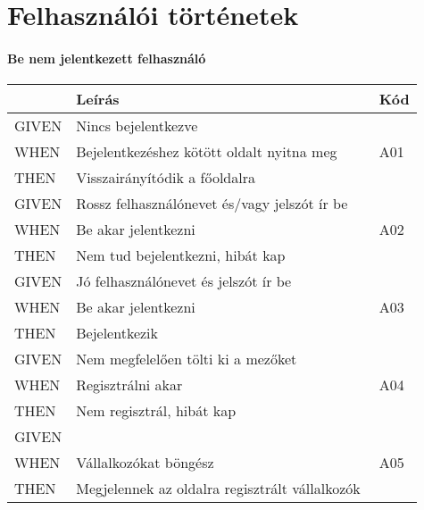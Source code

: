 \chapter{Felhasználói történetek}
\label{ch:stories}

\subsubsection{Be nem jelentkezett felhasználó}

\begin{table}[H]
	\centering
	\begin{tabular}{|m{0.1\linewidth}|m{0.75\linewidth}|m{0.06\linewidth}|}
		\hline
		& \textbf{Leírás} & \textbf{Kód} \\
		\hline
		GIVEN & Nincs bejelentkezve & \multirow{3}{*}{A01} \\ \cline{1-2}
		WHEN  & Bejelentkezéshez kötött oldalt nyitna meg & \\ \cline{1-2}
		THEN  & Visszairányítódik a főoldalra & \\ 
		\hline
		GIVEN & Rossz felhasználónevet és/vagy jelszót ír be & \multirow{3}{*}{A02} \\ \cline{1-2}
		WHEN  & Be akar jelentkezni & \\ \cline{1-2}
		THEN  & Nem tud bejelentkezni, hibát kap & \\ 
		\hline
		GIVEN & Jó felhasználónevet és jelszót ír be & \multirow{3}{*}{A03} \\ \cline{1-2}
		WHEN  & Be akar jelentkezni & \\ \cline{1-2}
		THEN  & Bejelentkezik & \\ 
		\hline
		GIVEN & Nem megfelelően tölti ki a mezőket & \multirow{3}{*}{A04} \\ \cline{1-2}
		WHEN  & Regisztrálni akar & \\ \cline{1-2}
		THEN  & Nem regisztrál, hibát kap & \\ 
		\hline
		GIVEN &  & \multirow{3}{*}{A05} \\ \cline{1-2}
		WHEN  & Vállalkozókat böngész & \\ \cline{1-2}
		THEN  & Megjelennek az oldalra regisztrált vállalkozók & \\ 
		\hline

	\end{tabular}
\end{table}

